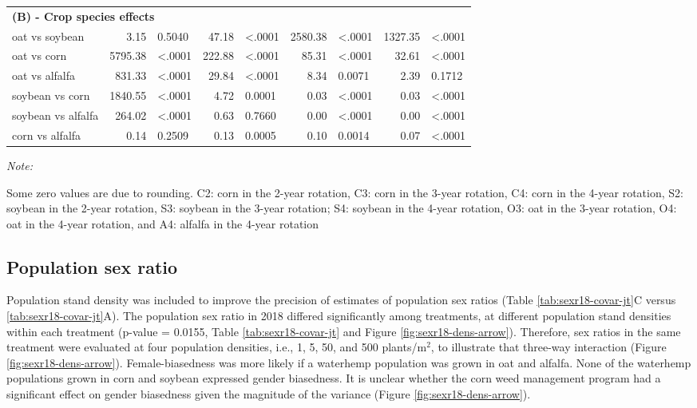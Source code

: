 \documentclass[
]{article}
\begin{document}
\begin{table}
\begin{threeparttable}
\begin{tabular}[t]{lrlr>{}l|rlrl}
\multicolumn{9}{l}{\textbf{(B) - Crop species effects}}\\
\hspace{1em}oat vs soybean & 3.15 & 0.5040 & 47.18 & <.0001 & 2580.38 & <.0001 & 1327.35 & <.0001\\
\hspace{1em}oat vs corn & 5795.38 & <.0001 & 222.88 & <.0001 & 85.31 & <.0001 & 32.61 & <.0001\\
\hspace{1em}oat vs alfalfa & 831.33 & <.0001 & 29.84 & <.0001 & 8.34 & 0.0071 & 2.39 & 0.1712\\
\hspace{1em}soybean vs corn & 1840.55 & <.0001 & 4.72 & 0.0001 & 0.03 & <.0001 & 0.03 & <.0001\\
\hspace{1em}soybean vs alfalfa & 264.02 & <.0001 & 0.63 & 0.7660 & 0.00 & <.0001 & 0.00 & <.0001\\
\hspace{1em}corn vs alfalfa & 0.14 & 0.2509 & 0.13 & 0.0005 & 0.10 & 0.0014 & 0.07 & <.0001\\
\bottomrule
\end{tabular}
\begin{tablenotes}[para]
\item \textit{Note: } 
\item Some zero values are due to rounding. C2: corn in the 2-year rotation, C3: corn in the 3-year rotation, C4: corn in the 4-year rotation, S2: soybean in the 2-year rotation, S3: soybean in the 3-year rotation; S4: soybean in the 4-year rotation, O3: oat in the 3-year rotation, O4: oat in the 4-year rotation, and A4: alfalfa in the 4-year rotation
\end{tablenotes}
\end{threeparttable}
\end{table}

\hypertarget{population-sex-ratio-1}{%
\subsection*{Population sex ratio}\label{population-sex-ratio-1}}

Population stand density was included to improve the precision of estimates of population sex ratios (Table \ref{tab:sexr18-covar-jt}C versus \ref{tab:sexr18-covar-jt}A). The population sex ratio in 2018 differed significantly among treatments, at different population stand densities within each treatment (p-value = 0.0155, Table \ref{tab:sexr18-covar-jt} and Figure \ref{fig:sexr18-dens-arrow}). Therefore, sex ratios in the same treatment were evaluated at four population densities, i.e., 1, 5, 50, and 500 plants/m\(^2\), to illustrate that three-way interaction (Figure \ref{fig:sexr18-dens-arrow}). Female-biasedness was more likely if a waterhemp population was grown in oat and alfalfa. None of the waterhemp populations grown in corn and soybean expressed gender biasedness. It is unclear whether the corn weed management program had a significant effect on gender biasedness given the magnitude of the variance (Figure \ref{fig:sexr18-dens-arrow}).
\end{document}
